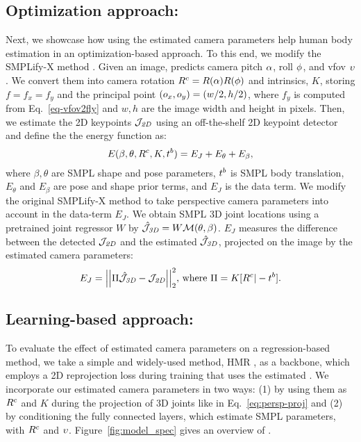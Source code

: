 \documentclass[10pt,twocolumn,letterpaper,usenames,dvipsnames]{article}
\begin{document}
\subsection{Optimization approach: \smplify}
\label{optimization_method}
Next, we showcase how using the estimated camera parameters help human body estimation in an optimization-based approach. 
To this end, we modify the SMPLify-X method \cite{SMPL-X:2019}. 
Given an image, \camcalib predicts camera pitch $\alpha$, roll $\phi$, and vfov $\upsilon$.
We convert them into camera rotation $R^c = R(\alpha)R(\phi)$ and intrinsics, $K$, storing $f=f_x=f_y$ and the principal point $(o_x, o_y)=(w/2, h/2)$,
where $f_y$ is computed from Eq.~\ref{eq-vfov2fly} and $w,h$ are the image width and height in pixels. Then, we estimate the 2D keypoints $\mathcal{J}_{\mathit{2D}}$ using an off-the-shelf 2D keypoint detector~\cite{mmpose2020} and define the the \smplify energy function as:
\begin{equation}
    E(\beta, \theta, R^c, K, t^b) = E_{J} + E_{\theta} + E_{\beta},
\end{equation}
where $\beta, \theta$ are SMPL shape and pose parameters, $t^b$ is SMPL body translation, $E_{\theta}$ and $E_\beta$ are pose and shape prior terms, and $E_{J}$ is the data term. We modify the original SMPLify-X method to take perspective camera parameters into account in the data-term $E_{J}$. 
We obtain SMPL 3D joint locations using a pretrained joint regressor $W$ by $\hat{\mathcal{J}}_{\mathit{3D}} = W \mathcal{M}(\theta, \beta)$. 
$E_{J}$ measures the difference between the detected $\mathcal{J}_{\mathit{2D}}$ and the estimated $\hat{\mathcal{J}}_{\mathit{3D}}$, projected on the image by the estimated camera parameters:
\begin{equation}
\label{eq:persp-proj}
    E_{J} = \Big|\Big| \Pi \hat{\mathcal{J}}_{\mathit{3D}} - \mathcal{J}_{\mathit{2D}} \Big|\Big|^{2}_{2}\text{, where } \Pi = K[R^c | -t^b].
\end{equation}
\subsection{Learning-based approach: \methodname}
\label{regression_method}
To evaluate the effect of estimated camera parameters on a regression-based method, we take a simple and widely-used method, HMR \cite{kanazawa_hmr}, as a backbone, which employs a 2D reprojection loss during training that uses the estimated \iwcam. 
We incorporate our estimated camera parameters in two ways:
(1) by using them as $R^c$ and $K$ during the projection of 3D joints like in Eq.~\ref{eq:persp-proj} and 
(2) by conditioning the fully connected layers, which estimate SMPL parameters, with $R^c$ and $\upsilon$.
Figure~\ref{fig:model_spec} gives an overview of \methodname.
\end{document}
